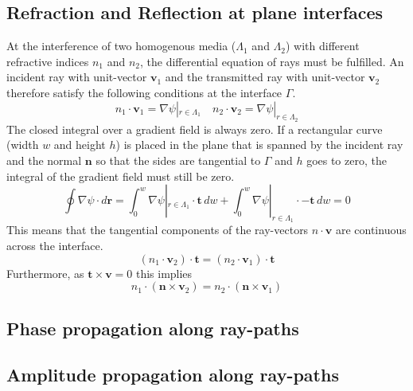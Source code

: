 \subsection{Refraction and Reflection at plane interfaces}
At the interference of two homogenous media (\(\Lambda_1\) and \(\Lambda_2\)) with different refractive indices \(n_1\) and \(n_2\), the differential equation of rays must be fulfilled.
An incident ray with unit-vector \(\mathbf{v}_1\) and the transmitted ray with unit-vector \(\mathbf{v}_2\) therefore satisfy the following conditions at the interface \(\Gamma \).
\begin{equation}
    n_1 \cdot \mathbf{v}_1 = \nabla \psi|_{r \in \Lambda_1 } \quad n_2 \cdot \mathbf{v}_2 = \nabla \psi|_{r \in \Lambda_2 } 
\end{equation}
The closed integral over a gradient field is always zero.
If a rectangular curve (width \(w\) and height \(h\)) is placed in the plane that is spanned by the incident ray and the normal \(\mathbf{n}\) so that the sides are tangential to \(\Gamma \) and \(h\) goes to zero, the integral of the gradient field must still be zero.
\begin{equation}
    \oint \nabla \psi \cdot d\mathbf{r} = \int_{0}^{w} \nabla \psi|_{r \in \Lambda_1 } \cdot \mathbf{t} \, dw + \int_{0}^{w} \nabla \psi|_{r \in \Lambda_1 } \cdot -\mathbf{t} \, dw = 0
\end{equation}
This means that the tangential components of the ray-vectors \(n \cdot \mathbf{v}\) are continuous across the interface.
\begin{equation}
    (n_1 \cdot \mathbf{v}_2) \cdot \mathbf{t} = (n_2 \cdot \mathbf{v}_1) \cdot \mathbf{t}
\end{equation}
Furthermore, as \(\mathbf{t} \times \mathbf{v} = 0\) this implies
\begin{equation}
    n_1 \cdot (\mathbf{n} \times \mathbf{v}_2) = n_2 \cdot (\mathbf{n} \times \mathbf{v}_1)
\end{equation}



\subsection{Phase propagation along ray-paths}



\subsection{Amplitude propagation along ray-paths}










